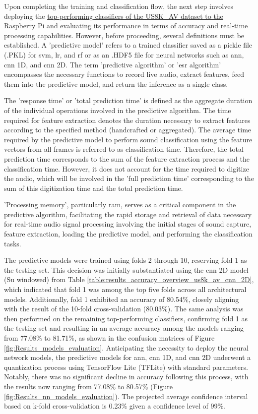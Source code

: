 Upon completing the training and classification flow, the next step involves deploying the \underline{top-performing classifiers of the US8K\_AV dataset to the Raspberry Pi} and evaluating its performance in terms of accuracy and real-time processing capabilities. However, before proceeding, several definitions must be established. A 'predictive model' refers to a trained classifier saved as a pickle file (.PKL) for \gls{svm}, \gls{lr}, and \gls{rf} or as an .HDF5 file for neural networks such as \gls{ann}, \gls{cnn} 1D, and \gls{cnn} 2D. The term 'predictive algorithm' or '\gls{esr} algorithm' encompasses the necessary functions to record live audio, extract features, feed them into the predictive model, and return the inference as a single class.

The 'response time' or 'total prediction time' is defined as the aggregate duration of the individual operations involved in the predictive algorithm. The time required for feature extraction denotes the duration necessary to extract features according to the specified method (handcrafted or aggregated). The average time required by the predictive model to perform sound classification using the feature vectors from all frames is referred to as classification time. Therefore, the total prediction time corresponds to the sum of the feature extraction process and the classification time. However, it does not account for the time required to digitize the audio, which will be involved in the 'full prediction time' corresponding to the sum of this digitization time and the total prediction time.

'Processing memory', particularly \gls{ram}, serves as a critical component in the predictive algorithm, facilitating the rapid storage and retrieval of data necessary for real-time audio signal processing involving the initial stages of sound capture, feature extraction, loading the predictive model, and performing the classification tasks.

The predictive models were trained using folds 2 through 10, reserving fold 1 as the testing set. This decision was initially substantiated using the \gls{cnn} 2D model (Su windowed) from Table \ref{table:results_accuracy_overview_us8k_av_cnn_2D}, which indicated that fold 1 was among the top five folds across all architectural models. Additionally, fold 1 exhibited an accuracy of 80.54\%, closely aligning with the result of the 10-fold cross-validation (80.03\%). The same analysis was then performed on the remaining top-performing classifiers, confirming fold 1 as the testing set and resulting in an average accuracy among the models ranging from 77.08\% to 81.71\%, as shown in the confusion matrices of Figure \ref{fig:Results_models_evaluation}. Anticipating the necessity to deploy the neural network models, the predictive models for \gls{ann}, \gls{cnn} 1D, and \gls{cnn} 2D underwent a quantization process using TensorFlow Lite (TFLite) with standard parameters. Notably, there was no significant decline in accuracy following this process, with the results now ranging from 77.08\% to 80.57\% (Figure \ref{fig:Results_nn_models_evaluation}). The projected average confidence interval based on k-fold cross-validation is 0.23\% given a confidence level of 99\%.

